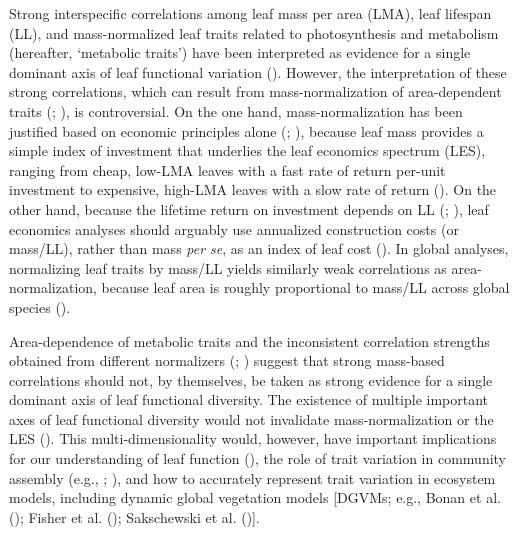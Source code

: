 \documentclass[
  12pt,
  letterpaper,
  DIV=11,
  numbers=noendperiod]{scrartcl}
\begin{document}
Strong interspecific correlations among leaf mass per area (LMA), leaf
lifespan (LL), and mass-normalized leaf traits related to photosynthesis
and metabolism (hereafter, `metabolic traits') have been interpreted as
evidence for a single dominant axis of leaf functional variation
(). However, the
interpretation of these strong correlations, which can result from
mass-normalization of area-dependent traits
(;
), is controversial. On the
one hand, mass-normalization has been justified based on economic
principles alone (;
), because leaf mass
provides a simple index of investment that underlies the leaf economics
spectrum (LES), ranging from cheap, low-LMA leaves with a fast rate of
return per-unit investment to expensive, high-LMA leaves with a slow
rate of return (). On the
other hand, because the lifetime return on investment depends on LL
(;
), leaf economics
analyses should arguably use annualized construction costs (or mass/LL),
rather than mass \emph{per se}, as an index of leaf cost
(). In global analyses,
normalizing leaf traits by mass/LL yields similarly weak correlations as
area-normalization, because leaf area is roughly proportional to mass/LL
across global species ().

Area-dependence of metabolic traits and the inconsistent correlation
strengths obtained from different normalizers
(;
) suggest that strong
mass-based correlations should not, by themselves, be taken as strong
evidence for a single dominant axis of leaf functional diversity. The
existence of multiple important axes of leaf functional diversity would
not invalidate mass-normalization or the LES
(). This
multi-dimensionality would, however, have important implications for our
understanding of leaf function (), the role of trait variation in community assembly (e.g.,
;
), and how to
accurately represent trait variation in ecosystem models, including
dynamic global vegetation models {[}DGVMs; e.g., Bonan et al.
(); Fisher et al.
(); Sakschewski et al.
(){]}.
\end{document}
